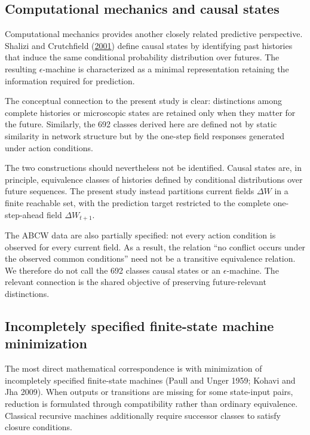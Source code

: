 \documentclass[
  11pt,
]{article}
\begin{document}
\hypertarget{computational-mechanics-and-causal-states}{%
\subsection{Computational mechanics and causal
states}\label{computational-mechanics-and-causal-states}}

Computational mechanics provides another closely related predictive
perspective. Shalizi and Crutchfield
(\protect\hyperlink{ref-shalizi2001}{2001}) define causal states by
identifying past histories that induce the same conditional probability
distribution over futures. The resulting \({\epsilon}\)-machine is
characterized as a minimal representation retaining the information
required for prediction.

The conceptual connection to the present study is clear: distinctions
among complete histories or microscopic states are retained only when
they matter for the future. Similarly, the 692 classes derived here are
defined not by static similarity in network structure but by the
one-step field responses generated under action conditions.

The two constructions should nevertheless not be identified. Causal
states are, in principle, equivalence classes of histories defined by
conditional distributions over future sequences. The present study
instead partitions current fields \({\Delta W}\) in a finite reachable
set, with the prediction target restricted to the complete
one-step-ahead field \({\Delta W_{t+1}}\).

The ABCW data are also partially specified: not every action condition
is observed for every current field. As a result, the relation ``no
conflict occurs under the observed common conditions'' need not be a
transitive equivalence relation. We therefore do not call the 692
classes causal states or an \({\epsilon}\)-machine. The relevant
connection is the shared objective of preserving future-relevant
distinctions.

\hypertarget{incompletely-specified-finite-state-machine-minimization}{%
\subsection{Incompletely specified finite-state machine
minimization}\label{incompletely-specified-finite-state-machine-minimization}}

The most direct mathematical correspondence is with minimization of
incompletely specified finite-state machines (Paull and Unger 1959;
Kohavi and Jha 2009). When outputs or transitions are missing for some
state-input pairs, reduction is formulated through compatibility rather
than ordinary equivalence. Classical recursive machines additionally
require successor classes to satisfy closure conditions.
\end{document}
